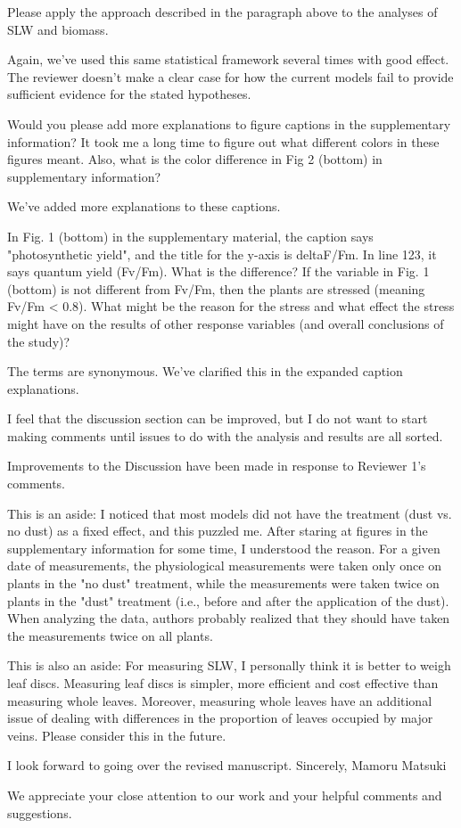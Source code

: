 \documentclass[parskip=half]{scrartcl}
\newcommand{\AR}[1]
	{\color{PineGreen}#1\color{black} \par }
\begin{document}
Please apply the approach described in the paragraph above to the analyses of SLW and biomass.

\AR{Again, we've used this same statistical framework several times with good effect. The reviewer doesn't make a clear case for how the current models fail to provide sufficient evidence for the stated hypotheses.}

Would you please add more explanations to figure captions in the supplementary information?
It took me a long time to figure out what different colors in these figures meant. Also, what is the color difference in Fig 2 (bottom) in supplementary information?

\AR{We've added more explanations to these captions.} 

In Fig. 1 (bottom) in the supplementary material, the caption says "photosynthetic yield", and the title for the y-axis is deltaF/Fm. In line 123, it says quantum yield (Fv/Fm). What is the difference? If the variable in Fig. 1 (bottom) is not different from Fv/Fm, then the plants are stressed (meaning Fv/Fm < 0.8). What might be the reason for the stress and what effect the stress might have on the results of other response variables (and overall conclusions of the study)?

\AR{The terms are synonymous. We've clarified this in the expanded caption explanations.} 

I feel that the discussion section can be improved, but I do not want to start making comments until issues to do with the analysis and results are all sorted.

\AR{Improvements to the Discussion have been made in response to Reviewer 1's comments.}

This is an aside: I noticed that most models did not have the treatment (dust vs. no dust) as a fixed effect, and this puzzled me. After staring at figures in the supplementary information for some time, I understood the reason. For a given date of measurements, the physiological measurements were taken only once on plants in the "no dust" treatment, while the measurements were taken twice on plants in the "dust" treatment (i.e., before and after the application of the dust). When analyzing the data, authors probably realized that they should have taken the measurements twice on all plants.

This is also an aside: For measuring SLW, I personally think it is better to weigh leaf discs. Measuring leaf discs is simpler, more efficient and cost effective than measuring whole leaves. Moreover, measuring whole leaves have an additional issue of dealing with differences in the proportion of leaves occupied by major veins. Please consider this in the future.

I look forward to going over the revised manuscript.
Sincerely,
Mamoru Matsuki

\AR{We appreciate your close attention to our work and your helpful comments and suggestions.}
\end{document}
